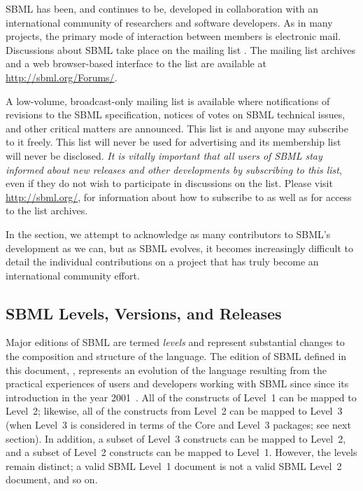 SBML has been, and continues to be, developed in collaboration
with an international community of researchers and software
developers.  As in many projects, the primary mode of interaction
between members is electronic mail.  Discussions about SBML take
place on the mailing list
.  The
mailing list archives and a web browser-based interface to the
list are available at \url{http://sbml.org/Forums/}.

A low-volume, broadcast-only mailing list is available 
where notifications of
revisions to the SBML speci\-fication, notices of votes on SBML
technical issues, and other critical matters are announced.  This
list is 
and anyone may subscribe to it freely.  This list will never be
used for advertising and its membership list will never be
disclosed.  \emph{It is vitally important that all users of SBML
  stay informed about new releases and other developments by
  subscribing to this list}, even if they do not wish to
participate in discussions on the
 list.
Please visit \url{http://sbml.org/},
for information about how to subscribe to
 as well
as for access to the list archives.

In the  section, we attempt to acknowledge
as many contributors to SBML's development as we can, but as SBML
evolves, it becomes increasingly difficult to detail the
individual contributions on a project that has truly become an
international community effort.


\subsection{SBML Levels, Versions, and Releases}
\label{sec:levels-versions-releases}

Major editions of SBML are termed \emph{levels} and represent
substantial changes to the composition and structure of the
language.  The edition of SBML defined in this document,
\sbmlthree, represents an evolution of the language resulting from
the practical experiences of users and developers working with
SBML since since its introduction in the year
2001~\citep{hucka:2001,hucka:2003}.  All of the constructs of
Level~1 can be mapped to Level~2; likewise, all of the constructs
from Level~2 can be mapped to Level~3 (when Level~3 is considered
in terms of the Core and Level~3 packages; see next section).  In
addition, a subset of Level~3 constructs can be mapped to Level~2,
and a subset of Level~2 constructs can be mapped to Level~1.
However, the levels remain distinct; a valid SBML Level~1 document
is not a valid SBML Level~2 document, and so on.

